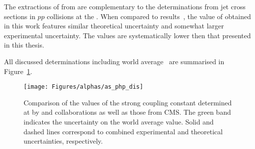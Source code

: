 The extractions of \asz from \hera are complementary to the determinations from jet cross sections in $pp$ collisions at the \lhc. When compared to \cms results~\cite{Chatrchyan:2012bja,Chatrchyan:2013txa,CMS:2014mna}, the value of \asz obtained in this work features similar theoretical uncertainty and somewhat larger experimental uncertainty. The \cms values are systematically lower then that presented in this thesis.

All discussed determinations including world average~\cite{PDG:2014} are summarised in Figure~\ref{fig:as_php_dis}.
\begin{figure}[htpb]
	\centering
		\texttt{[image: Figures/alphas/as\_php\_dis]}
	\caption{Comparison of the values of the strong coupling constant determined at \hera by \hone and \zeus collaborations as well as those from CMS. The green band indicates the uncertainty on the world average \as value. Solid and dashed lines correspond to combined experimental and theoretical uncertainties, respectively.}
	\label{fig:as_php_dis}
\end{figure}
